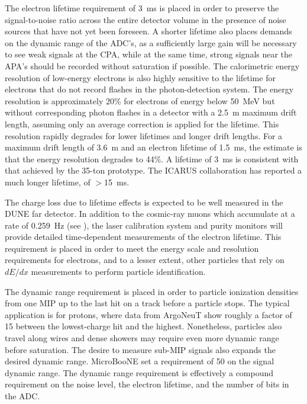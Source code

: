The electron lifetime requirement of 3~ms is placed in order to
preserve the signal-to-noise ratio across the entire detector volume
in the presence of noise sources that have not yet been foreseen.  A
shorter lifetime also places demands on the dynamic range of the
ADC's, as a sufficiently large gain will be necessary to see weak
signals at the CPA, while at the same time, strong signals near the
APA's should be recorded without saturation if possible.  The
calorimetric energy resolution of low-energy electrons is also highly
sensitive to the lifetime for electrons that do not record flashes in
the photon-detection system.  The energy resolution is approximately
20\% for electrons of energy below 50~MeV but without corresponding
photon flashes in a detector with a 2.5~m maximum drift length,
assuming only an average correction is applied for the lifetime.  This
resolution rapidly degrades for lower lifetimes and longer drift
lengths.  For a maximum drift length of 3.6~m and an electron lifetime
of 1.5~ms, the estimate is that the energy resolution degrades to
44\%.  A lifetime of 3~ms is consistent with that achieved by the
35-ton prototype.  The ICARUS collaboration has reported a much longer
lifetime, of $>$15~ms\cite{Antonello:2014eha}.

The charge loss due to lifetime effects is expected to be well
measured in the DUNE far detector.  In addition to the cosmic-ray
muons which accumulate at a rate of 0.259~Hz (see \anxrates), the
laser calibration system and purity monitors will provide detailed
time-dependent measurements of the electron lifetime.  This
requirement is placed in order to meet the energy scale and resolution
requirements for electrons, and to a lesser extent, other particles
that rely on $dE/dx$ measurements to perform particle identification.

The dynamic range requirement is placed in order to particle
ionization densities from one MIP up to the last hit on a track before
a particle stops.  The typical application is for protons, where data
from ArgoNeuT show roughly a factor of 15 between the lowest-charge
hit and the highest.  Nonetheless, particles also travel along wires
and dense showers may require even more dynamic range before
saturation.  The desire to measure sub-MIP signals also expands the
desired dynamic range.  MicroBooNE set a requirement of 50 on the
signal dynamic range\cite{microboonetdr}.  The dynamic range
requirement is effectively a compound requirement on the noise level,
the electron lifetime, and the number of bits in the ADC.

